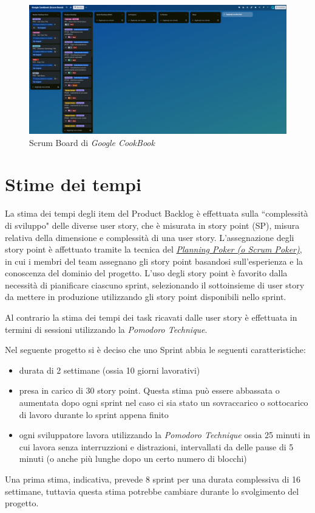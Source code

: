 \documentclass{article}
\begin{document}
\begin{figure}[h]
    \includegraphics[width=\textwidth]{./imgs/scrum-board.png}
    \caption{Scrum Board di \textit{Google CookBook}}
\end{figure}

\newpage
\section{Stime dei tempi}

La stima dei tempi degli item del Product Backlog è effettuata sulla ``complessità di sviluppo" delle diverse user story, 
che è misurata in story point (SP), misura relativa della dimensione e complessità di una user story.
L'assegnazione degli story point è affettuato tramite la tecnica del 
\href{https://en.wikipedia.org/wiki/Planning_poker}{\textit{Planning Poker (o Scrum Poker)}}, 
in cui i membri del team assegnano gli story point basandosi sull'esperienza e la conoscenza del 
dominio del progetto.
L'uso degli story point è favorito dalla necessità di pianificare ciascuno sprint, selezionando 
il sottoinsieme di user story da mettere in produzione utilizzando gli story point disponibili 
nello sprint.

Al contrario la stima dei tempi dei task ricavati dalle user story è effettuata in termini di sessioni utilizzando 
la \textit{Pomodoro Technique}.


Nel seguente progetto si è deciso che uno Sprint abbia le seguenti caratteristiche:
\begin{itemize}
    \item durata di 2 settimane (ossia 10 giorni lavorativi)
    \item presa in carico di 30 story point. Questa stima può essere abbassata o aumentata dopo 
    ogni sprint nel caso ci sia stato un sovraccarico o sottocarico di lavoro durante lo sprint 
    appena finito
    \item ogni sviluppatore lavora utilizzando la \textit{Pomodoro Technique} ossia 25 minuti in cui 
    lavora senza interruzzioni e distrazioni, intervallati da delle pause di 5 minuti (o anche più lunghe
    dopo un certo numero di blocchi)
\end{itemize}

Una prima stima, indicativa, prevede 8 sprint per una durata complessiva di 16 settimane, tuttavia 
questa stima potrebbe cambiare durante lo svolgimento del progetto.
\end{document}
